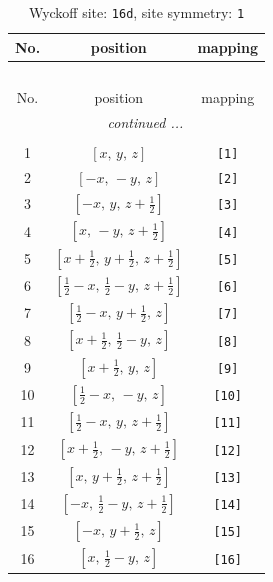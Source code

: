 \documentclass[fleqn,8pt]{jsarticle}
\begin{document}
\begin{longtable}{ccc}
\caption{Wyckoff site: {\tt 16d}, site symmetry: {\tt 1}}
 \\
 \hline \hline
No. & position & mapping \\ \hline \endfirsthead

\multicolumn{2}{l}{\tablename\ \thetable{}} \\
 \hline \hline
No. & position & mapping \\ \hline \endhead

 \hline \hline
\multicolumn{2}{r}{\footnotesize\it continued ...} \\ \endfoot

 \hline \hline
\multicolumn{2}{r}{} \\ \endlastfoot

1 & $\left[ x,\, y,\, z \right]$ & {\tt [1]} \\ \hline
2 & $\left[ - x,\, - y,\, z \right]$ & {\tt [2]} \\ \hline
3 & $\left[ - x,\, y,\, z + \frac{1}{2} \right]$ & {\tt [3]} \\ \hline
4 & $\left[ x,\, - y,\, z + \frac{1}{2} \right]$ & {\tt [4]} \\ \hline
5 & $\left[ x + \frac{1}{2},\, y + \frac{1}{2},\, z + \frac{1}{2} \right]$ & {\tt [5]} \\ \hline
6 & $\left[ \frac{1}{2} - x,\, \frac{1}{2} - y,\, z + \frac{1}{2} \right]$ & {\tt [6]} \\ \hline
7 & $\left[ \frac{1}{2} - x,\, y + \frac{1}{2},\, z \right]$ & {\tt [7]} \\ \hline
8 & $\left[ x + \frac{1}{2},\, \frac{1}{2} - y,\, z \right]$ & {\tt [8]} \\ \hline
9 & $\left[ x + \frac{1}{2},\, y,\, z \right]$ & {\tt [9]} \\ \hline
10 & $\left[ \frac{1}{2} - x,\, - y,\, z \right]$ & {\tt [10]} \\ \hline
11 & $\left[ \frac{1}{2} - x,\, y,\, z + \frac{1}{2} \right]$ & {\tt [11]} \\ \hline
12 & $\left[ x + \frac{1}{2},\, - y,\, z + \frac{1}{2} \right]$ & {\tt [12]} \\ \hline
13 & $\left[ x,\, y + \frac{1}{2},\, z + \frac{1}{2} \right]$ & {\tt [13]} \\ \hline
14 & $\left[ - x,\, \frac{1}{2} - y,\, z + \frac{1}{2} \right]$ & {\tt [14]} \\ \hline
15 & $\left[ - x,\, y + \frac{1}{2},\, z \right]$ & {\tt [15]} \\ \hline
16 & $\left[ x,\, \frac{1}{2} - y,\, z \right]$ & {\tt [16]} \\
\end{longtable}
\end{document}
